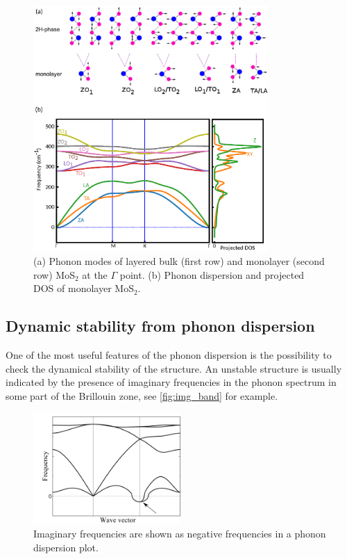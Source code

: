\begin{figure}[htbp!] 
\centering  
\includegraphics[width=0.8\textwidth]{ph_mos2.eps}
\caption{(a) Phonon modes of layered bulk (first row) and monolayer (second row) MoS$_2$ at the $\Gamma$ point. (b) Phonon dispersion and projected DOS of monolayer MoS$_2$.}  
\label{fig:mos2_ph}
\end{figure} 


\subsection{Dynamic stability from phonon dispersion}

One of the most useful features of the phonon dispersion is the possibility to check the dynamical stability of the structure. An unstable structure is usually indicated by the presence of imaginary frequencies in the phonon spectrum in some part of the Brillouin zone, see \autoref{fig:img_band} for example. 


\begin{figure}[htb] 
\centering  
\includegraphics[width=0.5\textwidth]{img_band.png}
\caption{ Imaginary frequencies are shown as negative frequencies in a phonon dispersion plot.}  
\label{fig:img_band}
\end{figure} 

